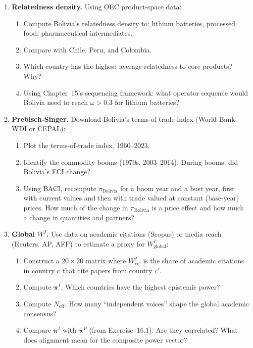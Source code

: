 \documentclass[../structural_economics_book.tex]{subfiles}
\begin{document}
\begin{enumerate}[label=\textbf{16.\arabic*}, leftmargin=3em]
\item \textbf{Relatedness density.} Using OEC product-space data:
\begin{enumerate}
\item Compute Bolivia's relatedness density to: lithium batteries, processed food, pharmaceutical intermediates.
\item Compare with Chile, Peru, and Colombia.
\item Which country has the highest average relatedness to core products? Why?
\item Using Chapter~15's sequencing framework: what operator sequence would Bolivia need to reach $\omega > 0.3$ for lithium batteries?
\end{enumerate}

\item \textbf{Prebisch-Singer.} Download Bolivia's terms-of-trade index (World Bank WDI or CEPAL):
\begin{enumerate}
\item Plot the terms-of-trade index, 1960--2023.
\item Identify the commodity booms (1970s, 2003--2014). During booms: did Bolivia's ECI change?
\item Using BACI, recompute $\pi_{\text{Bolivia}}$ for a boom year and a bust year, first with current values and then with trade valued at constant (base-year) prices. How much of the change in $\pi_{\text{Bolivia}}$ is a price effect and how much a change in quantities and partners?
\end{enumerate}

\item \textbf{Global $W^I$.} Use data on academic citations (Scopus) or media reach (Reuters, AP, AFP) to estimate a proxy for $W^I_{\text{global}}$:
\begin{enumerate}
\item Construct a $20 \times 20$ matrix where $W^I_{cc'}$ is the share of academic citations in country $c$ that cite papers from country $c'$.
\item Compute $\boldsymbol{\pi}^I$. Which countries have the highest epistemic power?
\item Compute $N_{\text{eff}}$. How many ``independent voices'' shape the global academic consensus?
\item Compare $\boldsymbol{\pi}^I$ with $\boldsymbol{\pi}^P$ (from Exercise~16.1). Are they correlated? What does alignment mean for the composite power vector?
\end{enumerate}


\end{enumerate}
\end{document}

